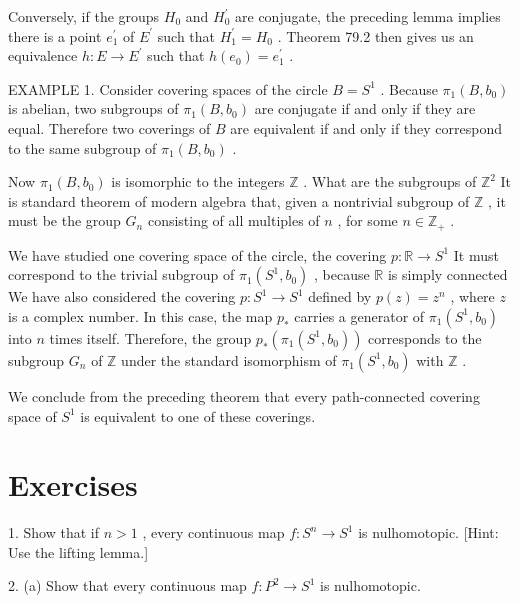 Conversely, if the groups \({H}_{0}\) and \({H}_{0}^{\prime }\) are conjugate, the preceding lemma implies there is a point \({e}_{1}^{\prime }\) of \({E}^{\prime }\) such that \({H}_{1}^{\prime } = {H}_{0}\) . Theorem 79.2 then gives us an equivalence \(h : E \rightarrow  {E}^{\prime }\) such that \(h\left( {e}_{0}\right)  = {e}_{1}^{\prime }\) .

EXAMPLE 1. Consider covering spaces of the circle \(B = {S}^{1}\) . Because \({\pi }_{1}\left( {B,{b}_{0}}\right)\) is abelian, two subgroups of \({\pi }_{1}\left( {B,{b}_{0}}\right)\) are conjugate if and only if they are equal. Therefore two coverings of \(B\) are equivalent if and only if they correspond to the same subgroup of \({\pi }_{1}\left( {B,{b}_{0}}\right)\) .

Now \({\pi }_{1}\left( {B,{b}_{0}}\right)\) is isomorphic to the integers \(\mathbb{Z}\) . What are the subgroups of \({\mathbb{Z}}^{2}\) It is standard theorem of modern algebra that, given a nontrivial subgroup of \(\mathbb{Z}\) , it must be the group \({G}_{n}\) consisting of all multiples of \(n\) , for some \(n \in  {\mathbb{Z}}_{ + }\) .

We have studied one covering space of the circle, the covering \(p : \mathbb{R} \rightarrow  {S}^{1}\) It must correspond to the trivial subgroup of \({\pi }_{1}\left( {{S}^{1},{b}_{0}}\right)\) , because \(\mathbb{R}\) is simply connected We have also considered the covering \(p : {S}^{1} \rightarrow  {S}^{1}\) defined by \(p\left( z\right)  = {z}^{n}\) , where \(z\) is a complex number. In this case, the map \({p}_{ * }\) carries a generator of \({\pi }_{1}\left( {{S}^{1},{b}_{0}}\right)\) into \(n\) times itself. Therefore, the group \({p}_{ * }\left( {{\pi }_{1}\left( {{S}^{1},{b}_{0}}\right) }\right)\) corresponds to the subgroup \({G}_{n}\) of \(\mathbb{Z}\) under the standard isomorphism of \({\pi }_{1}\left( {{S}^{1},{b}_{0}}\right)\) with \(\mathbb{Z}\) .

We conclude from the preceding theorem that every path-connected covering space of \({S}^{1}\) is equivalent to one of these coverings.

\section*{Exercises}

1. Show that if \(n > 1\) , every continuous map \(f : {S}^{n} \rightarrow  {S}^{1}\) is nulhomotopic. [Hint: Use the lifting lemma.]

2. (a) Show that every continuous map \(f : {P}^{2} \rightarrow  {S}^{1}\) is nulhomotopic.

